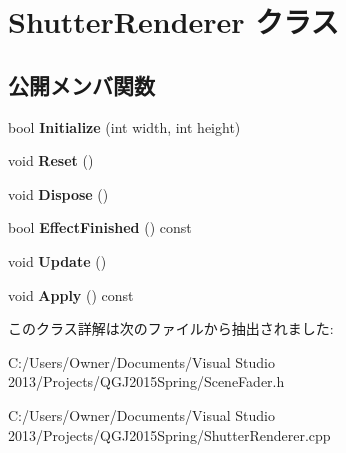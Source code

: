 \hypertarget{class_shutter_renderer}{}\section{Shutter\+Renderer クラス}
\label{class_shutter_renderer}
\subsection*{公開メンバ関数}
\begin{DoxyCompactItemize}
\item 
bool {\bfseries Initialize} (int width, int height)\hypertarget{class_shutter_renderer_aaf6c099441c2ff96918a65daa5d42491}{}\label{class_shutter_renderer_aaf6c099441c2ff96918a65daa5d42491}

\item 
void {\bfseries Reset} ()\hypertarget{class_shutter_renderer_ab34822a683fcd409124739167cbae988}{}\label{class_shutter_renderer_ab34822a683fcd409124739167cbae988}

\item 
void {\bfseries Dispose} ()\hypertarget{class_shutter_renderer_a7ca2ddc2caaa164415383d58ede1fbc1}{}\label{class_shutter_renderer_a7ca2ddc2caaa164415383d58ede1fbc1}

\item 
bool {\bfseries Effect\+Finished} () const \hypertarget{class_shutter_renderer_a62c45e7d87948f6d4fb42bc53ab35dad}{}\label{class_shutter_renderer_a62c45e7d87948f6d4fb42bc53ab35dad}

\item 
void {\bfseries Update} ()\hypertarget{class_shutter_renderer_a339a3163fd424196503869d5dfbc7b56}{}\label{class_shutter_renderer_a339a3163fd424196503869d5dfbc7b56}

\item 
void {\bfseries Apply} () const \hypertarget{class_shutter_renderer_aa898f24c7235ee1dde9d2b34298a6d6b}{}\label{class_shutter_renderer_aa898f24c7235ee1dde9d2b34298a6d6b}

\end{DoxyCompactItemize}


このクラス詳解は次のファイルから抽出されました\+:\begin{DoxyCompactItemize}
\item 
C\+:/\+Users/\+Owner/\+Documents/\+Visual Studio 2013/\+Projects/\+Q\+G\+J2015\+Spring/Scene\+Fader.\+h\item 
C\+:/\+Users/\+Owner/\+Documents/\+Visual Studio 2013/\+Projects/\+Q\+G\+J2015\+Spring/Shutter\+Renderer.\+cpp\end{DoxyCompactItemize}
